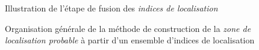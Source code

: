 \begin{figure}
  \centering
  
  \caption{Illustration de l'étape de fusion des \emph{indices de
      localisation}}
  \label{fig:ex_fus_inf}
\end{figure}


\begin{landscape}
  \begin{figure}[!h]
    \centering
    
    \caption{Organisation générale de la méthode de construction de la
    \emph{zone de localisation probable} à partir d'un ensemble
    d'indices de localisation}
    \label{fig:methodo_1}
  \end{figure}
\end{landscape}


